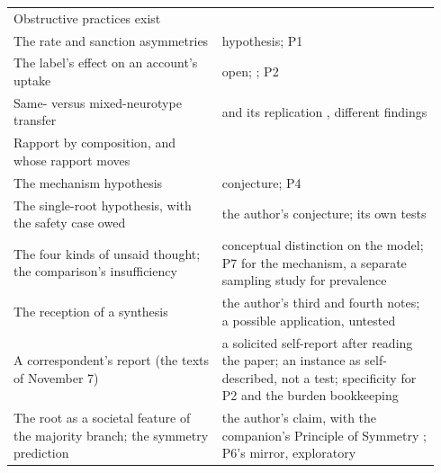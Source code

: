 \begin{center}
\begin{tabular}{p{0.46\linewidth} p{0.48\linewidth}}
Obstructive practices exist & \cite{Silver2025, Black2023, Crompton2020b} \\
The rate and sanction asymmetries & hypothesis; P1 \\
The label's effect on an account's uptake & open; \cite{Sasson2017, SassonMorrison2019}; P2 \\
Same- versus mixed-neurotype transfer & \cite{Crompton2020} and its replication \cite{Crompton2025}, different findings \\
Rapport by composition, and whose rapport moves & \cite{Foster2025} \\
The mechanism hypothesis & conjecture; P4 \\
The single-root hypothesis, with the safety case owed & the author's conjecture; its own tests \\
The four kinds of unsaid thought; the comparison's insufficiency & conceptual distinction on the model; P7 for the mechanism, a separate sampling study for prevalence \\
The reception of a synthesis & the author's third and fourth notes; a possible application, untested \\
A correspondent's report (the texts of November 7) & a solicited self-report after reading the paper; an instance as self-described, not a test; specificity for P2 and the burden bookkeeping \\
The root as a societal feature of the majority branch; the symmetry prediction & the author's claim, with the companion's Principle of Symmetry \cite{NormCost}; P6's mirror, exploratory \\
\bottomrule
\end{tabular}
\end{center}

